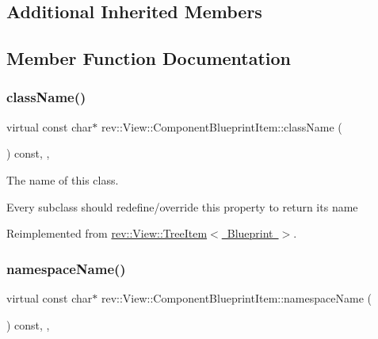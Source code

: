 \subsection*{Additional Inherited Members}


\subsection{Member Function Documentation}
\mbox{\label{classrev_1_1_view_1_1_component_blueprint_item_a735f5d6800e98b51ec826fd4ca05dd91}} 
\subsubsection{\texorpdfstring{className()}{className()}}
{\footnotesize\ttfamily virtual const char$\ast$ rev\+::\+View\+::\+Component\+Blueprint\+Item\+::class\+Name (\begin{DoxyParamCaption}{ }\end{DoxyParamCaption}) const\hspace{0.3cm}{\ttfamily [inline]}, {\ttfamily [override]}, {\ttfamily [virtual]}}



The name of this class. 

Every subclass should redefine/override this property to return its name 

Reimplemented from \mbox{\hyperlink{classrev_1_1_view_1_1_tree_item_a8a12a6ceece6cab7a2299da2b5e6a54b}{rev\+::\+View\+::\+Tree\+Item$<$ Blueprint $>$}}.

\mbox{\label{classrev_1_1_view_1_1_component_blueprint_item_a0b0ed2cacce8cc3e1d7cc7ac14ca3c6f}} 
\subsubsection{\texorpdfstring{namespaceName()}{namespaceName()}}
{\footnotesize\ttfamily virtual const char$\ast$ rev\+::\+View\+::\+Component\+Blueprint\+Item\+::namespace\+Name (\begin{DoxyParamCaption}{ }\end{DoxyParamCaption}) const\hspace{0.3cm}{\ttfamily [inline]}, {\ttfamily [override]}, {\ttfamily [virtual]}}



